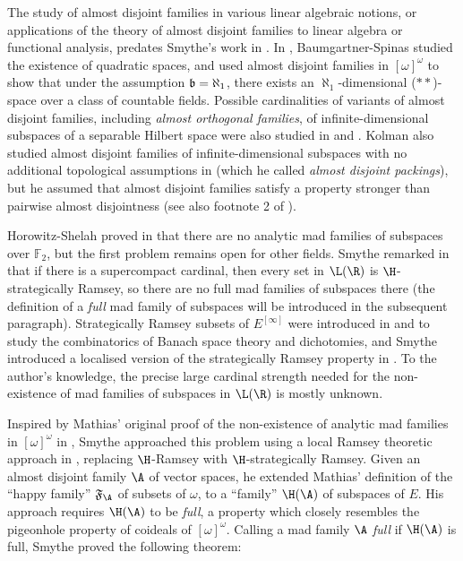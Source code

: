 \documentclass[11pt,reqno]{amsart}
\begin{document}
The study of almost disjoint families in various linear algebraic notions, or applications of the theory of almost disjoint families to linear algebra or functional analysis, predates Smythe's work in \cite{S19}. In \cite{BS91}, Baumgartner-Spinas studied the existence of quadratic spaces, and used almost disjoint families in $[\omega]^\omega$ to show that under the assumption $\frak{b} = \aleph_1$, there exists an $\aleph_1$-dimensional ($**$)-space over a class of countable fields. Possible cardinalities of variants of almost disjoint families, including \emph{almost orthogonal families}, of infinite-dimensional subspaces of a separable Hilbert space were also studied in \cite{B11} and \cite{W08}. Kolman also studied almost disjoint families of infinite-dimensional subspaces with no additional topological assumptions in \cite{K00} (which he called \emph{almost disjoint packings}), but he assumed that almost disjoint families satisfy a property stronger than pairwise almost disjointness (see also footnote 2 of \cite{S19}).

Horowitz-Shelah proved in \cite{HS22} that there are no analytic mad families of subspaces over $\mathbb{F}_2$, but the first problem remains open for other fields. Smythe remarked in \cite{S19} that if there is a supercompact cardinal, then every set in $\L(\R)$ is $\H$-strategically Ramsey, so there are no full mad families of subspaces there (the definition of a \emph{full} mad family of subspaces will be introduced in the subsequent paragraph). Strategically Ramsey subsets of $E^{[\infty]}$ were introduced in \cite{R09} and \cite{R10} to study the combinatorics of Banach space theory and dichotomies, and Smythe introduced a localised version of the strategically Ramsey property in \cite{S18}. To the author's knowledge, the precise large cardinal strength needed for the non-existence of mad families of subspaces in $\L(\R)$ is mostly unknown.

Inspired by Mathias' original proof of the non-existence of analytic mad families in $[\omega]^\omega$ in \cite{M77}, Smythe approached this problem using a local Ramsey theoretic approach in \cite{S19}, replacing $\H$-Ramsey with $\H$-strategically Ramsey. Given an almost disjoint family $\A$ of vector spaces, he extended Mathias' definition of the ``happy family'' $\mathfrak{F}_\A$ of subsets of $\omega$, to a ``family'' $\H(\A)$ of subspaces of $E$. His approach requires $\H(\A)$ to be \emph{full}, a property which closely resembles the pigeonhole property of coideals of $[\omega]^\omega$. Calling a mad family $\A$ \emph{full} if $\H(\A)$ is full, Smythe proved the following theorem:
\end{document}
